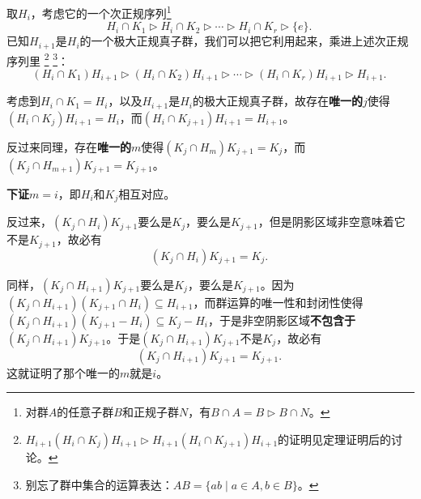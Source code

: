 取$H_i$，考虑它的一个次正规序列\footnote{对群$A$的任意子群$B$和正规子群$N$，有$B\cap A=B\rhd B\cap N$。}
\begin{equation}
    H_i\cap K_1\rhd H_i\cap K_2\rhd \cdots \rhd H_i\cap K_r\rhd \{e\}. 
~\end{equation}
已知$H_{i+1}$是$H_i$的一个极大正规真子群，我们可以把它利用起来，乘进上述次正规序列里
\footnote{$H_{i+1}(H_i\cap K_j)H_{i+1}\rhd H_{i+1}(H_i\cap K_{j+1})H_{i+1}$的证明见定理证明后的讨论。}
\footnote{别忘了群中集合的运算表达：$AB=\{ab\mid a\in A, b\in B\}$。}：
\begin{equation}\label{eq_SemGrp_1}
    (H_i\cap K_1)H_{i+1}\rhd (H_i\cap K_2)H_{i+1}\rhd \cdots \rhd (H_i\cap K_r)H_{i+1}\rhd H_{i+1}. 
~\end{equation}

考虑到$H_i\cap K_1=H_i$，以及$H_{i+1}$是$H_i$的极大正规真子群，故存在\textbf{唯一的}$j$使得$(H_i\cap K_j)H_{i+1}=H_i$，而$(H_i\cap K_{j+1})H_{i+1}=H_{i+1}$。

反过来同理，存在\textbf{唯一的}$m$使得$(K_j\cap H_m)K_{j+1}=K_j$，而$(K_j\cap H_{m+1})K_{j+1}=K_{j+1}$。






\textbf{下证}$m=i$，即$H_i$和$K_j$相互对应。







反过来，$(K_j\cap H_i)K_{j+1}$要么是$K_j$，要么是$K_{j+1}$，但是阴影区域非空意味着它不是$K_{j+1}$，故必有
\begin{equation}
    (K_j\cap H_i)K_{j+1} = K_j. 
~\end{equation}

同样，$(K_j\cap H_{i+1})K_{j+1}$要么是$K_j$，要么是$K_{j+1}$。因为$(K_j\cap H_{i+1})(K_{j+1}\cap H_i)\subseteq H_{i+1}$，而群运算的唯一性和封闭性使得$(K_j\cap H_{i+1})(K_{j+1} - H_i)\subseteq K_j-H_i$，于是非空阴影区域\textbf{不包含于}$(K_j\cap H_{i+1})K_{j+1}$。于是$(K_j\cap H_{i+1})K_{j+1}$不是$K_j$，故必有
\begin{equation}
    (K_j\cap H_{i+1})K_{j+1} = K_{j+1}. 
~\end{equation}
这就证明了那个唯一的$m$就是$i$。









